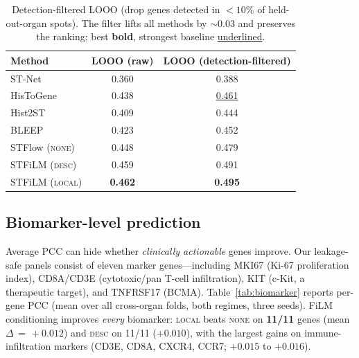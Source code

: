 \documentclass[10pt,twocolumn,letterpaper]{article}
\begin{document}
\begin{table}[t]
\centering
\small
\setlength{\tabcolsep}{5pt}
\begin{tabular}{lcc}
\toprule
Method & LOOO (raw) & LOOO (detection-filtered) \\
\midrule
ST-Net~\cite{stnet}        & 0.360 & 0.388 \\
HisToGene~\cite{histogene} & 0.438 & \underline{0.461} \\
Hist2ST~\cite{hist2st}     & 0.409 & 0.444 \\
BLEEP~\cite{bleep}         & 0.423 & 0.452 \\
\midrule
STFlow (\textsc{none})     & 0.448 & 0.479 \\
STFiLM (\textsc{desc})     & 0.459 & 0.491 \\
STFiLM (\textsc{local})    & \textbf{0.462} & \textbf{0.495} \\
\bottomrule
\end{tabular}
\caption{Detection-filtered LOOO (drop genes detected in ${<}10\%$ of held-out-organ spots).
The filter lifts all methods by ${\sim}0.03$ and preserves the ranking; best \textbf{bold},
strongest baseline \underline{underlined}.}
\label{tab:filtered}
\end{table}

\subsection{Biomarker-level prediction}
Average PCC can hide whether \emph{clinically actionable} genes improve. Our leakage-safe panels
consist of eleven marker genes---including MKI67 (Ki-67 proliferation index), CD8A/CD3E
(cytotoxic/pan T-cell infiltration), KIT (c-Kit, a therapeutic target), and TNFRSF17 (BCMA).
Table~\ref{tab:biomarker} reports per-gene PCC (mean over all cross-organ folds, both regimes,
three seeds). FiLM conditioning improves \emph{every} biomarker: \textsc{local} beats
\textsc{none} on \textbf{11/11} genes (mean $\Delta\,{=}\,{+}0.012$) and \textsc{desc} on
11/11 ($+0.010$), with the largest gains on immune-infiltration markers (CD3E, CD8A, CXCR4,
CCR7; $+0.015$ to $+0.016$).
\end{document}
